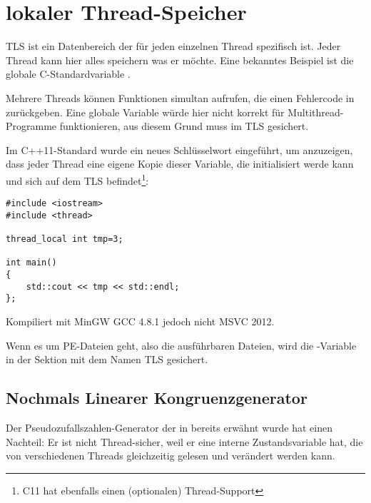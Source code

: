 \section{lokaler Thread-Speicher}
\label{TLS}

TLS ist ein Datenbereich der für jeden einzelnen Thread spezifisch ist.
Jeder Thread kann hier alles speichern was er möchte.
Eine bekanntes Beispiel ist die globale C-Standardvariable .

Mehrere Threads können Funktionen simultan aufrufen, die einen Fehlercode in  zurückgeben.
Eine globale Variable würde hier nicht korrekt für Multithread-Programme funktionieren,
aus diesem Grund muss  im \ac{TLS} gesichert.

Im C++11-Standard wurde ein neues Schlüsselwort  eingeführt,
um anzuzeigen, dass jeder Thread eine eigene Kopie dieser Variable, die initialisiert werde kann
und sich auf dem \ac{TLS} befindet\footnote{ C11 hat ebenfalls einen (optionalen) Thread-Support}:

\begin{lstlisting}[caption=C++11]
#include <iostream>
#include <thread>

thread_local int tmp=3;

int main()
{
	std::cout << tmp << std::endl;
};
\end{lstlisting}

Kompiliert mit MinGW GCC 4.8.1 jedoch nicht MSVC 2012.

Wenn es um PE-Dateien geht, also die ausführbaren Dateien, wird die -Variable
in der Sektion mit dem Namen \ac{TLS} gesichert.

\subsection{Nochmals Linearer Kongruenzgenerator}
\label{LCG_TLS}

Der Pseudozufallszahlen-Generator der in  bereits erwähnt wurde hat einen Nachteil:
Er ist nicht Thread-sicher, weil er eine interne Zustandsvariable hat, die von verschiedenen Threads
gleichzeitig gelesen und verändert werden kann.



